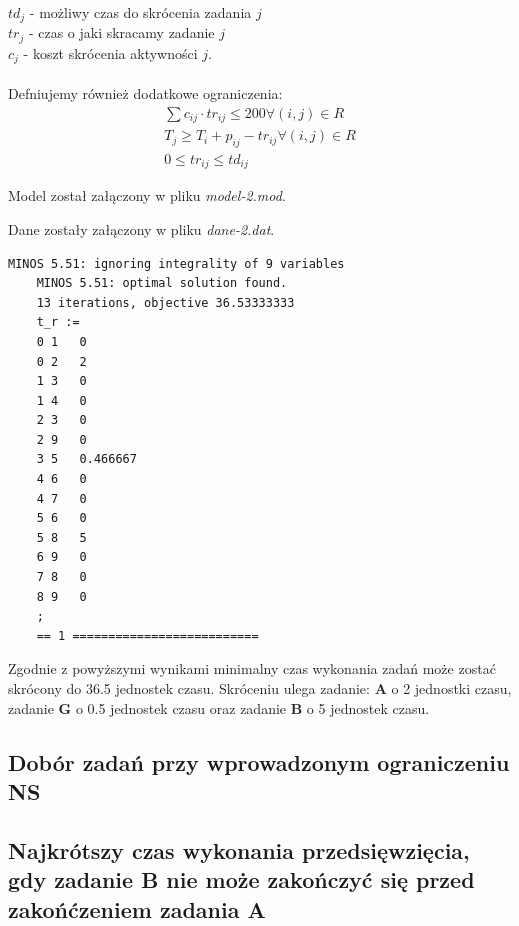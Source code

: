\documentclass[
    12pt, %
]{../fphw}
\begin{document}
\(td_j\) - możliwy czas do skrócenia zadania \(j\) \\
\(tr_j\) - czas o jaki skracamy zadanie \(j\) \\
\(c_j\) - koszt skrócenia aktywności \(j\). \\ \\
Defniujemy również dodatkowe ograniczenia:
\begin{align*}
    \sum c_{ij} \cdot tr_{ij} \leq 200 \forall (i, j) \in R \\
    T_j \geq T_i + p_{ij} - tr_{ij} \forall (i,j) \in R     \\
    0 \leq tr_{ij} \leq td_{ij}
\end{align*}

Model został załączony w pliku \textit{model-2.mod}.

Dane zostały załączony w pliku \textit{dane-2.dat}.
\begin{lstlisting}[caption=Rozwiązanie znalezione solwerem minos]
    MINOS 5.51: ignoring integrality of 9 variables
    MINOS 5.51: optimal solution found.
    13 iterations, objective 36.53333333
    t_r :=
    0 1   0
    0 2   2
    1 3   0
    1 4   0
    2 3   0
    2 9   0
    3 5   0.466667
    4 6   0
    4 7   0
    5 6   0
    5 8   5
    6 9   0
    7 8   0
    8 9   0
    ;
    == 1 ==========================
\end{lstlisting}
Zgodnie z powyższymi wynikami minimalny czas wykonania zadań może zostać skrócony do 36.5 jednostek czasu.
Skróceniu ulega zadanie: \textbf{A} o 2 jednostki czasu, zadanie \textbf{G} o 0.5 jednostek czasu 
oraz zadanie \textbf{B} o 5 jednostek czasu.
\subsection{Dobór zadań przy wprowadzonym ograniczeniu NS}
\subsection{Najkrótszy czas wykonania przedsięwzięcia, gdy zadanie B nie może zakończyć się przed zakońćzeniem zadania A}
\newpage
\lstlistoflistings
\listoffigures
\listoftables
\end{document}
